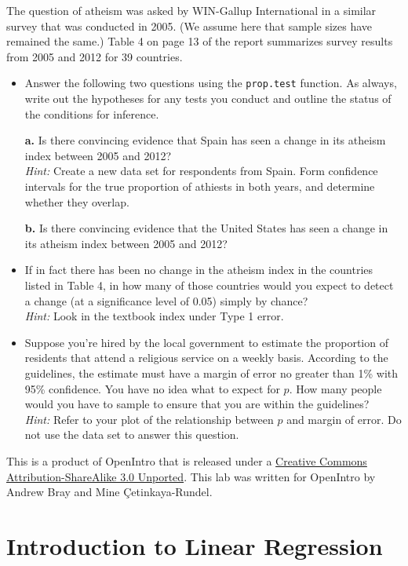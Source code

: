 \documentclass[]{book}
\theoremstyle{definition}
\theoremstyle{definition}
\theoremstyle{remark}
\begin{document}
The question of atheism was asked by WIN-Gallup International in a
similar survey that was conducted in 2005. (We assume here that sample
sizes have remained the same.) Table 4 on page 13 of the report
summarizes survey results from 2005 and 2012 for 39 countries.

\begin{itemize}
\item
  Answer the following two questions using the \texttt{prop.test}
  function. As always, write out the hypotheses for any tests you
  conduct and outline the status of the conditions for inference.

  \textbf{a.} Is there convincing evidence that Spain has seen a change
  in its atheism index between 2005 and 2012?\\
  \emph{Hint:} Create a new data set for respondents from Spain. Form
  confidence intervals for the true proportion of athiests in both
  years, and determine whether they overlap.

  \textbf{b.} Is there convincing evidence that the United States has
  seen a change in its atheism index between 2005 and 2012?
\item
  If in fact there has been no change in the atheism index in the
  countries listed in Table 4, in how many of those countries would you
  expect to detect a change (at a significance level of 0.05) simply by
  chance?\\
  \emph{Hint:} Look in the textbook index under Type 1 error.
\item
  Suppose you're hired by the local government to estimate the
  proportion of residents that attend a religious service on a weekly
  basis. According to the guidelines, the estimate must have a margin of
  error no greater than 1\% with 95\% confidence. You have no idea what
  to expect for \(p\). How many people would you have to sample to
  ensure that you are within the guidelines?\\
  \emph{Hint:} Refer to your plot of the relationship between \(p\) and
  margin of error. Do not use the data set to answer this question.
\end{itemize}

\hypertarget{license}{}
This is a product of OpenIntro that is released under a
\href{http://creativecommons.org/licenses/by-sa/3.0}{Creative Commons
Attribution-ShareAlike 3.0 Unported}. This lab was written for OpenIntro
by Andrew Bray and Mine Çetinkaya-Rundel.

\hypertarget{linear-regression}{\chapter*{Introduction to Linear
Regression}\label{linear-regression}}
\end{document}

